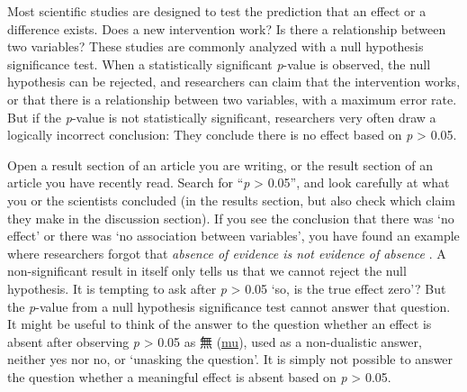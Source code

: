 \documentclass[
  oneside]{krantz}
\begin{document}
Most scientific studies are designed to test the prediction that an effect or a difference exists. Does a new intervention work? Is there a relationship between two variables? These studies are commonly analyzed with a null hypothesis significance test. When a statistically significant \emph{p}-value is observed, the null hypothesis can be rejected, and researchers can claim that the intervention works, or that there is a relationship between two variables, with a maximum error rate. But if the \emph{p}-value is not statistically significant, researchers very often draw a logically incorrect conclusion: They conclude there is no effect based on \emph{p} \textgreater{} 0.05.

Open a result section of an article you are writing, or the result section of an article you have recently read. Search for ``\emph{p} \textgreater{} 0.05'', and look carefully at what you or the scientists concluded (in the results section, but also check which claim they make in the discussion section). If you see the conclusion that there was `no effect' or there was `no association between variables', you have found an example where researchers forgot that \emph{absence of evidence is not evidence of absence} \citep{altman_statistics_1995}. A non-significant result in itself only tells us that we cannot reject the null hypothesis. It is tempting to ask after \emph{p} \textgreater{} 0.05 `so, is the true effect zero'? But the \emph{p}-value from a null hypothesis significance test cannot answer that question. It might be useful to think of the answer to the question whether an effect is absent after observing \emph{p} \textgreater{} 0.05 as 無 (\href{https://en.wikipedia.org/wiki/Mu_(negative)\#Non-dualistic_meaning}{mu}), used as a non-dualistic answer, neither yes nor no, or `unasking the question'. It is simply not possible to answer the question whether a meaningful effect is absent based on \emph{p} \textgreater{} 0.05.
\end{document}
